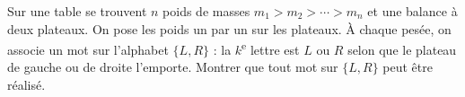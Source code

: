 Sur une table se trouvent $n$ poids de masses $m_1 > m_2 > \cdots > m_n$ et une balance à deux plateaux. On pose les poids un par un sur les plateaux. À chaque pesée, on associe un mot sur l'alphabet $\{L, R\}$ : la $k$\textsuperscript{e} lettre est $L$ ou $R$ selon que le plateau de gauche ou de droite l'emporte. Montrer que tout mot sur $\{L, R\}$ peut être réalisé.
